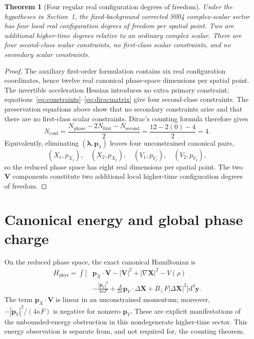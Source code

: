 \documentclass[11pt]{article}
\newtheorem{theorem}{Theorem}
\newcommand{\dd}{\mathrm{d}}
\newcommand{\bX}{\mathbf{X}}
\newcommand{\bV}{\mathbf{V}}
\newcommand{\bl}{\boldsymbol{\lambda}}
\newcommand{\bp}{\mathbf{p}}
\begin{document}
\begin{theorem}[Four regular real configuration degrees of freedom]
\label{thm:main}
Under the hypotheses in Section~1, the fixed-background corrected S004
complex-scalar sector has four local real configuration degrees of freedom
per spatial point. Two are additional higher-time degrees relative to an
ordinary complex scalar. There are four second-class scalar constraints,
no first-class scalar constraints, and no secondary scalar constraints.
\end{theorem}
\begin{proof}
The auxiliary first-order formulation contains six real configuration
coordinates, hence twelve real canonical phase-space dimensions per spatial
point. The invertible acceleration Hessian introduces no extra primary
constraint; equations~\eqref{eq:constraints}--\eqref{eq:diracmatrix}
give four second-class constraints. The preservation equations above show
that no secondary constraints arise and that there are no first-class
scalar constraints. Dirac's counting formula therefore gives
\begin{equation}
N_{\mathrm{conf}}=
\frac{N_{\mathrm{phase}}-2N_{\mathrm{first}}-N_{\mathrm{second}}}{2}
=\frac{12-2(0)-4}{2}=4.
\end{equation}
Equivalently, eliminating $(\bl,\bp_\lambda)$ leaves four
unconstrained canonical pairs,
\begin{equation}
(X_1,p_{X_1}),\quad (X_2,p_{X_2}),\quad
(V_1,p_{V_1}),\quad (V_2,p_{V_2}),
\end{equation}
so the reduced phase space has eight real dimensions per spatial point.
The two $\bV$ components constitute two additional local higher-time
configuration degrees of freedom.
\end{proof}

\section{Canonical energy and global phase charge}

On the reduced phase space, the exact canonical Hamiltonian is
\begin{equation}\label{eq:Hphys}
\boxed{\begin{aligned}
H_{\mathrm{phys}}=\int\Bigg[
&\bp_X\cdot\bV-|\bV|^2+|\nabla\bX|^2-V(\rho)\\
&-\frac{|\bp_V|^2}{4\kappa F}
+\frac{A}{2\kappa}\bp_V\cdot\Delta\bX
+B_\perp F|\Delta\bX|^2
\Bigg]\dd^d\mathbf y.
\end{aligned}}
\end{equation}
The term $\bp_X\cdot\bV$ is linear in an unconstrained momentum;
moreover, $-|\bp_V|^2/(4\kappa F)$ is negative for nonzero $\bp_V$.
These are explicit manifestations of the unbounded-energy obstruction
in this nondegenerate higher-time sector. This energy observation is
separate from, and not required for, the counting theorem.
\end{document}
